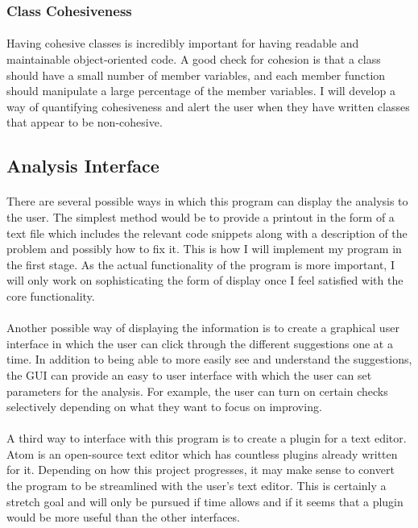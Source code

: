 \documentclass{article}
\begin{document}
\subsubsection{Class Cohesiveness}
\paragraph{} 
Having cohesive classes is incredibly important for having readable and maintainable object-oriented code. A good check for cohesion is that a class should have a small number of member variables, and each member function should manipulate a large percentage of the member variables. I will develop a way of quantifying cohesiveness and alert the user when they have written classes that appear to be non-cohesive.
\subsection{Analysis Interface}
\paragraph{} 
There are several possible ways in which this program can display the analysis to the user. The simplest method would be to provide a printout in the form of a text file which includes the relevant code snippets along with a description of the problem and possibly how to fix it. This is how I will implement my program in the first stage. As the actual functionality of the program is more important, I will only work on sophisticating the form of display once I feel satisfied with the core functionality.
\paragraph{} 
Another possible way of displaying the information is to create a graphical user interface in which the user can click through the different suggestions one at a time. In addition to being able to more easily see and understand the suggestions, the GUI can provide an easy to user interface with which the user can set parameters for the analysis. For example, the user can turn on certain checks selectively depending on what they want to focus on improving.
\paragraph{} 
A third way to interface with this program is to create a plugin for a text editor. Atom is an open-source text editor which has countless plugins already written for it. Depending on how this project progresses, it may make sense to convert the program to be streamlined with the user's text editor. This is certainly a stretch goal and will only be pursued if time allows and if it seems that a plugin would be more useful than the other interfaces.
\end{document}
